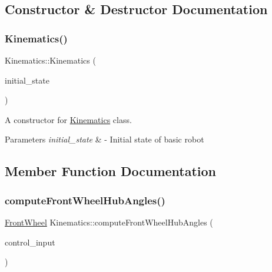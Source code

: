 \subsection{Constructor \& Destructor Documentation}
\mbox{\label{classKinematics_adb48748237fe9076e7d8aac5b435e95f}} 
\subsubsection{\texorpdfstring{Kinematics()}{Kinematics()}}
{\footnotesize\ttfamily Kinematics\+::\+Kinematics (\begin{DoxyParamCaption}\item[{const \hyperlink{structState}{State} \&}]{initial\+\_\+state }\end{DoxyParamCaption})}



A constructor for \hyperlink{classKinematics}{Kinematics} class. 


\begin{DoxyParams}{Parameters}
{\em initial\+\_\+state} & -\/ Initial state of basic robot \\
\hline
\end{DoxyParams}


\subsection{Member Function Documentation}
\mbox{\label{classKinematics_af5e5528ca44f82edae99025410595a36}} 
\subsubsection{\texorpdfstring{compute\+Front\+Wheel\+Hub\+Angles()}{computeFrontWheelHubAngles()}}
{\footnotesize\ttfamily \hyperlink{structFrontWheel}{Front\+Wheel} Kinematics\+::compute\+Front\+Wheel\+Hub\+Angles (\begin{DoxyParamCaption}\item[{const ackermann\+\_\+msgs\+::\+Ackermann\+Drive\+Stamped \&}]{control\+\_\+input }\end{DoxyParamCaption})}



